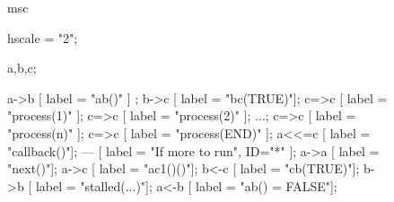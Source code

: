 \documentclass[11pt]{article}
\begin{document}
\begin{figure}[htb]
\begin{center}
\begin{msc}[format=svg]
msc {
  hscale = "2";

  a,b,c;

  a->b [ label = "ab()" ] ;
  b->c [ label = "bc(TRUE)"];
  c=>c [ label = "process(1)" ];
  c=>c [ label = "process(2)" ];
  ...;
  c=>c [ label = "process(n)" ];
  c=>c [ label = "process(END)" ];
  a<<=c [ label = "callback()"];
  ---  [ label = "If more to run", ID="*" ];
  a->a [ label = "next()"];
  a->c [ label = "ac1()()"];
  b<-c [ label = "cb(TRUE)"];
  b->b [ label = "stalled(...)"];
  a<-b [ label = "ab() = FALSE"];
}
\end{msc}
\end{center}
\end{figure}
\end{document}
